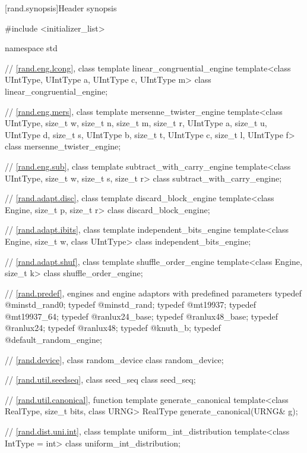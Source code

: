 [rand.synopsis]{Header  synopsis}%
%

\begin{codeblock}
#include <initializer_list>

namespace std {

 // \ref{rand.eng.lcong}, class template linear_congruential_engine
 template<class UIntType, UIntType a, UIntType c, UIntType m>
   class linear_congruential_engine;

 // \ref{rand.eng.mers}, class template mersenne_twister_engine
 template<class UIntType, size_t w, size_t n, size_t m, size_t r,
          UIntType a, size_t u, UIntType d, size_t s,
          UIntType b, size_t t,
          UIntType c, size_t l, UIntType f>
   class mersenne_twister_engine;

 // \ref{rand.eng.sub}, class template subtract_with_carry_engine
 template<class UIntType, size_t w, size_t s, size_t r>
   class subtract_with_carry_engine;

 // \ref{rand.adapt.disc}, class template discard_block_engine
 template<class Engine, size_t p, size_t r>
   class discard_block_engine;

 // \ref{rand.adapt.ibits}, class template independent_bits_engine
 template<class Engine, size_t w, class UIntType>
   class independent_bits_engine;

 // \ref{rand.adapt.shuf}, class template shuffle_order_engine
 template<class Engine, size_t k>
   class shuffle_order_engine;

 // \ref{rand.predef}, engines and engine adaptors with predefined parameters
 typedef @\seebelow@ minstd_rand0;
 typedef @\seebelow@ minstd_rand;
 typedef @\seebelow@ mt19937;
 typedef @\seebelow@ mt19937_64;
 typedef @\seebelow@ ranlux24_base;
 typedef @\seebelow@ ranlux48_base;
 typedef @\seebelow@ ranlux24;
 typedef @\seebelow@ ranlux48;
 typedef @\seebelow@ knuth_b;
 typedef @\seebelow@ default_random_engine;

 // \ref{rand.device}, class random_device
 class random_device;

 // \ref{rand.util.seedseq}, class seed_seq
 class seed_seq;

 // \ref{rand.util.canonical}, function template generate_canonical
 template<class RealType, size_t bits, class URNG>
   RealType generate_canonical(URNG& g);

 // \ref{rand.dist.uni.int}, class template uniform_int_distribution
 template<class IntType = int>
   class uniform_int_distribution;

}
\end{codeblock}
